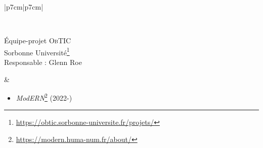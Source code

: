 \begin{table}[htbp]
{\begin{tabular}[t]{|p{7cm}|p{7cm}|}
\begin{minipage}[t]{\linewidth}
\begin{itemize}[leftmargin=*]
				\end{itemize}
			\end{minipage} \\ \hline
						\begin{minipage}[t]{\linewidth}
				Équipe-projet \textsc{ObTIC}\\
				Sorbonne Université\footnote{\url{https://obtic.sorbonne-universite.fr/projets/}}\\
				Responsable : Glenn Roe
			\end{minipage}
			&
			\begin{minipage}[t]{\linewidth}
				\begin{itemize}[leftmargin=*]
					\item \textit{Mod\textsc{ERN}}\footnote{\url{https://modern.huma-num.fr/about/}} (2022-)
					

\end{itemize}
\end{minipage}
\end{tabular}}
\end{table}
